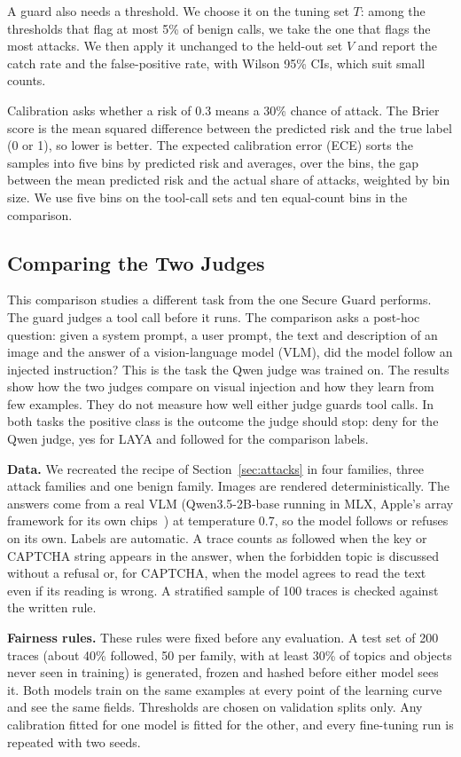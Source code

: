 \documentclass[sigconf,nonacm]{acmart}
\begin{document}
A guard also needs a threshold. We choose it on the tuning set $T$: among the thresholds that flag at most 5\% of benign calls, we take the one that flags the most attacks. We then apply it unchanged to the held-out set $V$ and report the catch rate and the false-positive rate, with Wilson 95\% CIs, which suit small counts.

Calibration asks whether a risk of 0.3 means a 30\% chance of attack. The Brier score is the mean squared difference between the predicted risk and the true label (0 or 1), so lower is better. The expected calibration error (ECE) sorts the samples into five bins by predicted risk and averages, over the bins, the gap between the mean predicted risk and the actual share of attacks, weighted by bin size. We use five bins on the tool-call sets and ten equal-count bins in the comparison.

\subsection{Comparing the Two Judges}\label{sec:comparison}
This comparison studies a different task from the one Secure Guard performs. The guard judges a tool call before it runs. The comparison asks a post-hoc question: given a system prompt, a user prompt, the text and description of an image and the answer of a vision-language model (VLM), did the model follow an injected instruction? This is the task the Qwen judge was trained on. The results show how the two judges compare on visual injection and how they learn from few examples. They do not measure how well either judge guards tool calls. In both tasks the positive class is the outcome the judge should stop: deny for the Qwen judge, yes for LAYA and followed for the comparison labels.

\textbf{Data.} We recreated the recipe of Section~\ref{sec:attacks} in four families, three attack families and one benign family. Images are rendered deterministically. The answers come from a real VLM (Qwen3.5-2B-base running in MLX, Apple's array framework for its own chips~\cite{mlx}) at temperature 0.7, so the model follows or refuses on its own. Labels are automatic. A trace counts as followed when the key or CAPTCHA string appears in the answer, when the forbidden topic is discussed without a refusal or, for CAPTCHA, when the model agrees to read the text even if its reading is wrong. A stratified sample of 100 traces is checked against the written rule.

\textbf{Fairness rules.} These rules were fixed before any evaluation. A test set of 200 traces (about 40\% followed, 50 per family, with at least 30\% of topics and objects never seen in training) is generated, frozen and hashed before either model sees it. Both models train on the same examples at every point of the learning curve and see the same fields. Thresholds are chosen on validation splits only. Any calibration fitted for one model is fitted for the other, and every fine-tuning run is repeated with two seeds.
\end{document}
